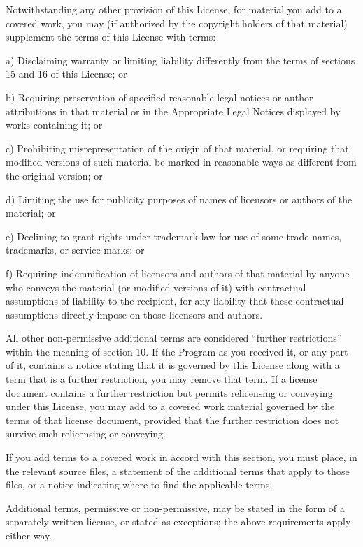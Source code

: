  Notwithstanding any other provision of this License, for material you
add to a covered work, you may (if authorized by the copyright holders of
that material) supplement the terms of this License with terms:

    a) Disclaiming warranty or limiting liability differently from the
    terms of sections 15 and 16 of this License; or

    b) Requiring preservation of specified reasonable legal notices or
    author attributions in that material or in the Appropriate Legal
    Notices displayed by works containing it; or

    c) Prohibiting misrepresentation of the origin of that material, or
    requiring that modified versions of such material be marked in
    reasonable ways as different from the original version; or

    d) Limiting the use for publicity purposes of names of licensors or
    authors of the material; or

    e) Declining to grant rights under trademark law for use of some
    trade names, trademarks, or service marks; or

    f) Requiring indemnification of licensors and authors of that
    material by anyone who conveys the material (or modified versions of
    it) with contractual assumptions of liability to the recipient, for
    any liability that these contractual assumptions directly impose on
    those licensors and authors.

  All other non-permissive additional terms are considered ``further
restrictions'' within the meaning of section 10.  If the Program as you
received it, or any part of it, contains a notice stating that it is
governed by this License along with a term that is a further
restriction, you may remove that term.  If a license document contains
a further restriction but permits relicensing or conveying under this
License, you may add to a covered work material governed by the terms
of that license document, provided that the further restriction does
not survive such relicensing or conveying.

  If you add terms to a covered work in accord with this section, you
must place, in the relevant source files, a statement of the
additional terms that apply to those files, or a notice indicating
where to find the applicable terms.

  Additional terms, permissive or non-permissive, may be stated in the
form of a separately written license, or stated as exceptions;
the above requirements apply either way.

